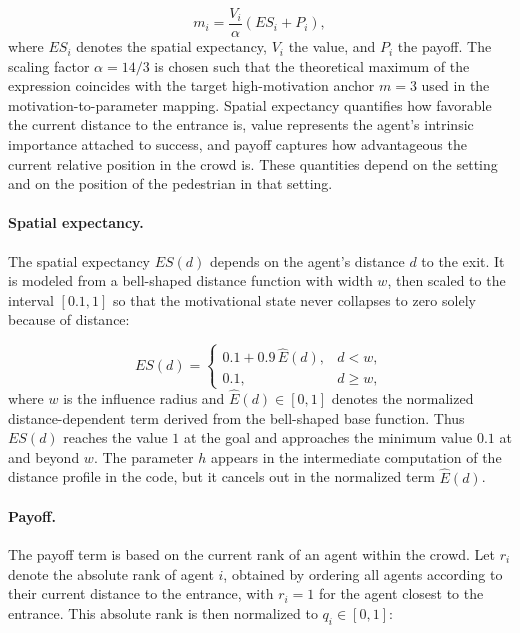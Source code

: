 \documentclass[pdflatex,sn-mathphys-num]{sn-jnl}%
\theoremstyle{thmstyleone}%
\theoremstyle{thmstyletwo}%
\theoremstyle{thmstylethree}%
\begin{document}
\begin{equation}
m_i = \frac{V_i}{\alpha}\left(ES_i + P_i\right),
\label{eq:motivation}
\end{equation}
where \(ES_i\) denotes the spatial expectancy, \(V_i\) the value, and
\(P_i\) the payoff. The scaling factor \(\alpha=14/3\) is chosen such
that the theoretical maximum of the expression coincides with the target
high-motivation anchor \(m=3\) used in the motivation-to-parameter
mapping. Spatial expectancy quantifies how favorable the current distance
to the entrance is, value represents the agent's intrinsic importance
attached to success, and payoff captures how advantageous the current
relative position in the crowd is. These quantities depend on the setting
and on the position of the pedestrian in that setting.

\paragraph{Spatial expectancy.}
The spatial expectancy \(ES(d)\) depends on the agent's distance \(d\) to
the exit. It is modeled from a bell-shaped distance function with width
\(w\), then scaled to the interval \([0.1,1]\) so that the motivational
state never collapses to zero solely because of distance:

\begin{equation}
ES(d) =
\begin{cases}
0.1 + 0.9\,\hat{E}(d), & d < w, \\
0.1, & d \ge w,
\end{cases}
\label{eq:expectancy}
\end{equation}
where \(w\) is the influence radius and \(\hat{E}(d)\in[0,1]\) denotes
the normalized distance-dependent term derived from the bell-shaped base
function. Thus \(ES(d)\) reaches the value \(1\) at the goal and approaches
the minimum value \(0.1\) at and beyond \(w\). The parameter \(h\) appears
in the intermediate computation of the distance profile in the code, but it
cancels out in the normalized term \(\hat{E}(d)\).

\paragraph{Payoff.}
The payoff term is based on the current rank of an agent within the crowd.
Let \(r_i\) denote the absolute rank of agent \(i\), obtained by ordering all
agents according to their current distance to the entrance, with \(r_i=1\)
for the agent closest to the entrance. This absolute rank is then normalized to
\(q_i\in[0,1]\):
\end{document}
